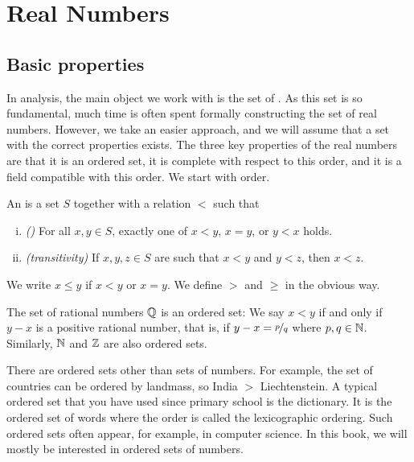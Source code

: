\chapter{Real Numbers} \label{rn:chapter}


\section{Basic properties} \label{sec:basicpropsrn}


In analysis, the main object we work with is the set of
.  As this set is so fundamental, much time is often
spent formally constructing the set of real numbers.  However, we
take an easier approach, and we will assume that a set with the correct
properties exists.
The three key properties of the real numbers are that it is
an ordered set, it is complete with respect to this order,
and it is a field compatible with this order.
We start with order.

\begin{defn}
An \emph{} is a set $S$ together with
a relation $<$ such that
\begin{enumerate}[(i)]
\item \emph{()} For all $x, y \in S$, exactly one of
$x < y$, $x=y$, or $y < x$ holds.
\item \emph{(transitivity)} If $x,y,z \in S$ are such that $x < y$ and $y
< z$, then $x < z$.
\end{enumerate}
We write $x \leq y$ if $x < y$ or $x=y$.  We define
$>$ and $\geq$ in the obvious way.
\end{defn}


The set of rational numbers ${\mathbb{Q}}$ is an ordered set: We say
$x < y$ if and only if $y-x$ is a positive rational number, that is,
if $y-x = \nicefrac{p}{q}$ where $p,q \in {\mathbb{N}}$.  Similarly,
${\mathbb{N}}$ and ${\mathbb{Z}}$ are also ordered sets.

There are ordered sets other than sets of numbers.  For example, the
set of countries can be ordered by landmass, so India $>$
Liechtenstein.
A typical ordered set that you have used since primary school is the
dictionary.  It is the ordered set of words where the order is
called the lexicographic ordering.  Such ordered sets often appear, for
example, in
computer science.  In this book, we will mostly be interested in ordered
sets of numbers.


